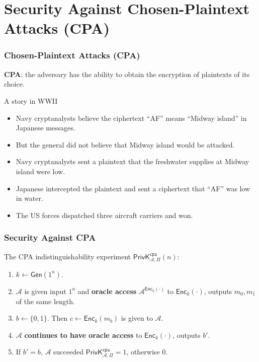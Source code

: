\section{Security Against Chosen-Plaintext Attacks (CPA)}
\begin{frame}\frametitle{Chosen-Plaintext Attacks (CPA)}
\textbf{CPA}: the adversary has the ability to obtain the encryption of plaintexts of its choice.

\begin{exampleblock}{A story in WWII}
\begin{itemize}
\item Navy cryptanalysts believe the ciphertext ``AF'' means ``Midway island'' in Japanese messages.
\item But the general did not believe that Midway island would be attacked.
\item Navy cryptanalysts sent a plaintext that the freshwater supplies at Midway island were low.
\item Japanese intercepted the plaintext and sent a ciphertext that ``AF'' was low in water.
\item The US forces dispatched three aircraft carriers and won.
\end{itemize}
\end{exampleblock}
\end{frame}
\begin{frame}\frametitle{Security Against CPA}
The CPA indistinguishability experiment $\mathsf{PrivK}^{\mathsf{cpa}}_{\mathcal{A},\Pi}(n)$:
\begin{enumerate}
	\item $k \gets \mathsf{Gen}(1^n)$.
	\item $\mathcal{A}$ is given input $1^n$ and \textbf{oracle access} $\mathcal{A}^{\mathsf{Enc}_k(\cdot)}$ to $\mathsf{Enc}_k(\cdot)$, outputs $m_0, m_1$ of the same length.
	\item $b \gets \{0,1\}$. Then $c \gets \mathsf{Enc}_k(m_b)$ is given to $\mathcal{A}$.
	\item $\mathcal{A}$ \textbf{continues to have oracle access} to $\mathsf{Enc}_k(\cdot)$, outputs $b'$.
	\item If $b' = b$, $\mathcal{A}$ succeeded $\mathsf{PrivK}^{\mathsf{cpa}}_{\mathcal{A},\Pi}=1$, otherwise 0.
\end{enumerate}
\begin{figure}
\begin{center}

\end{center}
\end{figure}
\end{frame}
